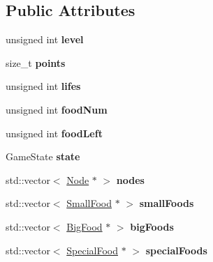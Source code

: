 \subsection*{Public Attributes}
\begin{DoxyCompactItemize}
\item 
\mbox{\label{classGameManager_a62299218660ab4144e99485cfdbb4ab3}} 
unsigned int {\bfseries level}
\item 
\mbox{\label{classGameManager_a3d16b7d34c5382f8073bd53a408f2f86}} 
size\+\_\+t {\bfseries points}
\item 
\mbox{\label{classGameManager_accc7ea8bcd2eb3f4deba90c257f6077d}} 
unsigned int {\bfseries lifes}
\item 
\mbox{\label{classGameManager_a76367d39b4b431d23c41adfdc788cdd8}} 
unsigned int {\bfseries food\+Num}
\item 
\mbox{\label{classGameManager_a9578c605b39ae7219e5d609ec8ad3052}} 
unsigned int {\bfseries food\+Left}
\item 
\mbox{\label{classGameManager_a54960067ed2ad301cd5a8de9aa1b9157}} 
Game\+State {\bfseries state}
\item 
\mbox{\label{classGameManager_a796fe777a7517619303e5ba6f0b2431d}} 
std\+::vector$<$ \hyperlink{classNode}{Node} $\ast$ $>$ {\bfseries nodes}
\item 
\mbox{\label{classGameManager_ae6f56a3dc9659110af486af0509ef47e}} 
std\+::vector$<$ \hyperlink{classSmallFood}{Small\+Food} $\ast$ $>$ {\bfseries small\+Foods}
\item 
\mbox{\label{classGameManager_a5147ed76e3a9f8879da5582b54a0ce14}} 
std\+::vector$<$ \hyperlink{classBigFood}{Big\+Food} $\ast$ $>$ {\bfseries big\+Foods}
\item 
\mbox{\label{classGameManager_a86b63ff049086d58aa6de0fcd36a0901}} 
std\+::vector$<$ \hyperlink{classSpecialFood}{Special\+Food} $\ast$ $>$ {\bfseries special\+Foods}
\item 

\end{DoxyCompactItemize}

